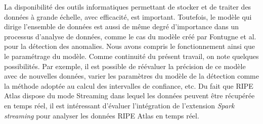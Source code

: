 La disponibilité des outils informatiques permettant de stocker et de traiter des données à grande échelle, avec efficacité,  est important. Toutefois,  le modèle qui dirige l'ensemble de données est aussi de même degré d'importance dans un processus d'analyse de données, comme le cas  du modèle créé par Fontugne et al. \cite{DBLP:journals/corr/FontugneAPB16} pour la détection des anomalies.  Nous avons compris le fonctionnement ainsi que le paramétrage du modèle. Comme continuité du présent travail, on note quelques possibilités. Par exemple, il est possible de réévaluer la précision  de ce modèle avec de nouvelles données, varier les paramètres du modèle de la détection comme la méthode adoptée au calcul des intervalles de confiance, etc. Du fait que RIPE Atlas dispose du mode Streaming dans lequel les données peuvent être récupérée en temps réel, il est intéressant d'évaluer l'intégration de l'extension \textit{Spark streaming} pour analyser les données RIPE Atlas en temps réel.  
 

































